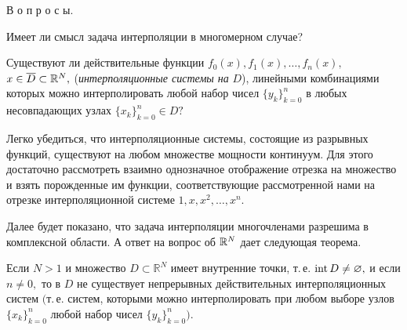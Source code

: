 {{В о п р о с ы}. \hspace{1em}}

Имеет ли смысл задача {интерполяции} в многомерном случае?

Существуют ли действительные функции {$f_0(x),f_1(x),\dots,f_n(x),$~ $x \in
\overline{D} \subset \mathbb{R}^N,$} ({\it интерполяционные системы на} $D$), {линейными
комбинациями которых} можно интерполировать {любой набор чисел $\{y_k\}_{k=0}^n$ в} любых
{несовпадающих узлах} $\{x_k\}_{k=0}^n \in D?$

Легко убедиться, что интерполяционные системы, состоящие из
разрывных функций, существуют на любом множестве мощности континуум. Для
этого достаточно рассмотреть взаимно однозначное
отображение отрезка на множество и взять порожденные им функции,
соответствующие рассмотренной нами на отрезке
интерполяционной системе $1,x,x^2,\dots ,x^n.$

Далее будет показано, что задача интерполяции многочленами разрешима
в комплексной области. А ответ на вопрос об $\mathbb{R}^N$ дает следующая теорема.

\begin{teo}[А.\,Хаар]
Если $N>1$ и множество $D\subset \mathbb R^N$ имеет
внутренние точки, т.\,е. {${\rm int \, } {D} \ne \varnothing,$} и если $n \ne 0,$ то {в
$D$ не существует} непрерывных действительных интерполяционных систем {$($т.\,е.
систем, которыми можно интерполировать} при любом выборе узлов $\{x_k\}^{n}_{k=0}$
любой набор чисел $\{ y_k\}_{k=0}^n).$
\end{teo}


